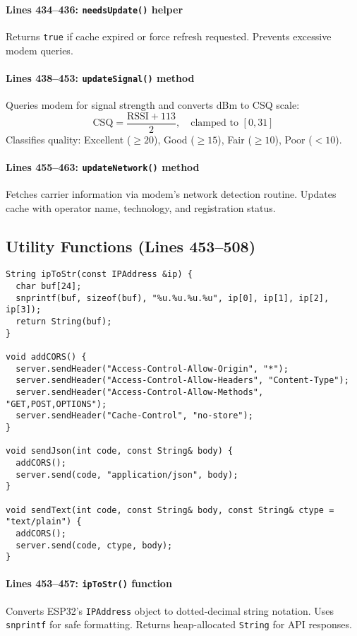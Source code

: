 \documentclass[11pt,a4paper]{article}
\begin{document}
\paragraph{Lines 434--436: \texttt{needsUpdate()} helper}
Returns \texttt{true} if cache expired or force refresh requested. Prevents excessive modem queries.

\paragraph{Lines 438--453: \texttt{updateSignal()} method}
Queries modem for signal strength and converts dBm to CSQ scale:
\begin{equation}
\text{CSQ} = \frac{\text{RSSI} + 113}{2}, \quad \text{clamped to } [0, 31]
\end{equation}
Classifies quality: Excellent ($\geq 20$), Good ($\geq 15$), Fair ($\geq 10$), Poor ($< 10$).

\paragraph{Lines 455--463: \texttt{updateNetwork()} method}
Fetches carrier information via modem's network detection routine. Updates cache with operator name, technology, and registration status.

\subsection{Utility Functions (Lines 453--508)}

\begin{verbatim}
String ipToStr(const IPAddress &ip) {
  char buf[24];
  snprintf(buf, sizeof(buf), "%u.%u.%u.%u", ip[0], ip[1], ip[2], ip[3]);
  return String(buf);
}

void addCORS() {
  server.sendHeader("Access-Control-Allow-Origin", "*");
  server.sendHeader("Access-Control-Allow-Headers", "Content-Type");
  server.sendHeader("Access-Control-Allow-Methods", "GET,POST,OPTIONS");
  server.sendHeader("Cache-Control", "no-store");
}

void sendJson(int code, const String& body) {
  addCORS();
  server.send(code, "application/json", body);
}

void sendText(int code, const String& body, const String& ctype = "text/plain") {
  addCORS();
  server.send(code, ctype, body);
}
\end{verbatim}

\paragraph{Lines 453--457: \texttt{ipToStr()} function}
Converts ESP32's \texttt{IPAddress} object to dotted-decimal string notation. Uses \texttt{snprintf} for safe formatting. Returns heap-allocated \texttt{String} for API responses.
\end{document}
